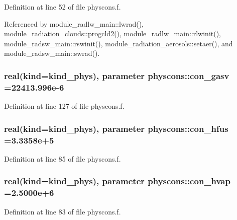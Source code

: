Definition at line 52 of file physcons.\+f.



Referenced by module\+\_\+radlw\+\_\+main\+::lwrad(), module\+\_\+radiation\+\_\+clouds\+::progcld2(), module\+\_\+radlw\+\_\+main\+::rlwinit(), module\+\_\+radsw\+\_\+main\+::rswinit(), module\+\_\+radiation\+\_\+aerosols\+::setaer(), and module\+\_\+radsw\+\_\+main\+::swrad().

\subsubsection[{\texorpdfstring{con\+\_\+gasv}{con_gasv}}]{\setlength{\rightskip}{0pt plus 5cm}real(kind=kind\+\_\+phys), parameter physcons\+::con\+\_\+gasv =22413.\+996e-\/6}\hypertarget{namespacephyscons_a154e74ee27785d0568c18955cb21f6ac}{}\label{namespacephyscons_a154e74ee27785d0568c18955cb21f6ac}


Definition at line 127 of file physcons.\+f.

\subsubsection[{\texorpdfstring{con\+\_\+hfus}{con_hfus}}]{\setlength{\rightskip}{0pt plus 5cm}real(kind=kind\+\_\+phys), parameter physcons\+::con\+\_\+hfus =3.\+3358e+5}\hypertarget{namespacephyscons_a6d9481f4395882116e2a26bc85a617a6}{}\label{namespacephyscons_a6d9481f4395882116e2a26bc85a617a6}


Definition at line 85 of file physcons.\+f.

\subsubsection[{\texorpdfstring{con\+\_\+hvap}{con_hvap}}]{\setlength{\rightskip}{0pt plus 5cm}real(kind=kind\+\_\+phys), parameter physcons\+::con\+\_\+hvap =2.\+5000e+6}\hypertarget{namespacephyscons_a65ec8e424f61ccfe8520bf7cc5c070f8}{}\label{namespacephyscons_a65ec8e424f61ccfe8520bf7cc5c070f8}


Definition at line 83 of file physcons.\+f.

